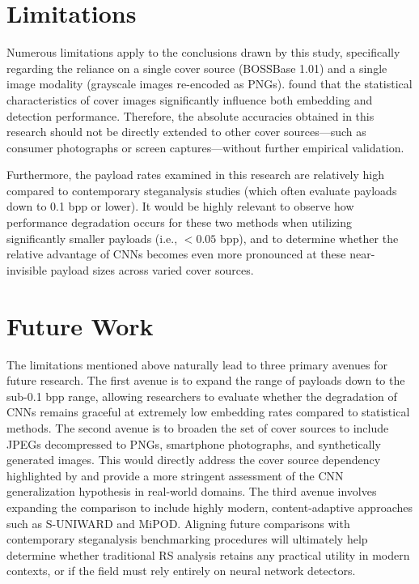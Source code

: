 \section{Limitations}

Numerous limitations apply to the conclusions drawn by this study, specifically regarding the reliance on a single cover source (BOSSBase 1.01) and a 
single image modality (grayscale images re-encoded as PNGs).
\textcite{Sedighi2016} found that the statistical characteristics of cover images significantly influence both embedding and detection performance. 
Therefore, the absolute accuracies obtained in this research should not be directly extended to other cover sources—such as consumer photographs or 
screen captures—without further empirical validation. 

Furthermore, the payload rates examined in this research are relatively high compared to contemporary steganalysis studies 
(which often evaluate payloads down to 0.1 bpp or lower). 
It would be highly relevant to observe how performance degradation occurs for these two methods when utilizing significantly smaller 
payloads (i.e., $< 0.05$ bpp), and to determine whether the relative advantage of CNNs becomes even more pronounced at these near-invisible 
payload sizes across varied cover sources.

\section{Future Work}

The limitations mentioned above naturally lead to three primary avenues for future research. 
The first avenue is to expand the range of payloads down to the sub-0.1 bpp range, allowing researchers to evaluate whether the degradation of 
CNNs remains graceful at extremely low embedding rates compared to statistical methods. 
The second avenue is to broaden the set of cover sources to include JPEGs decompressed to PNGs, smartphone photographs, and synthetically generated images. 
This would directly address the cover source dependency highlighted by \textcite{Sedighi2016} and provide a more stringent assessment of the CNN 
generalization hypothesis in real-world domains. 
The third avenue involves expanding the comparison to include highly modern, content-adaptive approaches such as S-UNIWARD and MiPOD. 
Aligning future comparisons with contemporary steganalysis benchmarking procedures will ultimately help determine whether traditional RS analysis 
retains any practical utility in modern contexts, or if the field must rely entirely on neural network detectors.

